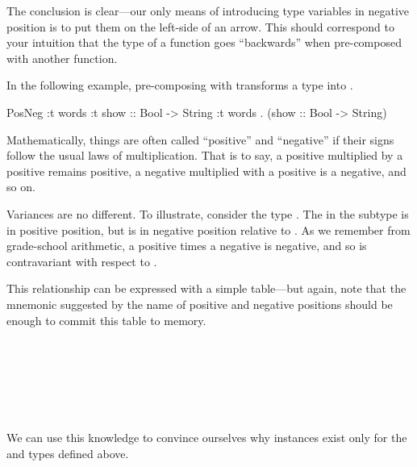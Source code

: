 \documentclass[book.tex]{subfiles}
\begin{document}
The conclusion is clear---our only means of introducing type variables in
negative position is to put them on the left-side of an arrow. This should
correspond to your intuition that the type of a function goes ``backwards'' when
pre-composed with another function.

In the following example, pre-composing with 
transforms a type  into .

\begin{dorepl}{PosNeg}
:t words
:t show :: Bool -> String
:t words . (show :: Bool -> String)
\end{dorepl}

Mathematically, things are often called ``positive'' and ``negative'' if their
signs follow the usual laws of multiplication. That is to say, a positive
multiplied by a positive remains positive, a negative multiplied with a positive
is a negative, and so on.

Variances are no different. To illustrate, consider the type . The  in the subtype  is in positive position, but
 is in negative position relative to . As we
remember from grade-school arithmetic, a positive times a negative is negative,
and so  is contravariant with respect to .

This relationship can be expressed with a simple table---but again, note that
the mnemonic suggested by the name of positive and negative positions should be
enough to commit this table to memory.

\spaceMyBox
\begin{myTable}
\hline
   \\ \hline
  \myRow{\myCol{$+$} \myCol{$+$} \myLastCol{$+$}} \\ \hline
  \myRow{\myCol{$+$} \myCol{$-$} \myLastCol{$-$}} \\ \hline
  \myRow{\myCol{$-$} \myCol{$+$} \myLastCol{$-$}} \\ \hline
  \myRow{\myCol{$-$} \myCol{$-$} \myLastCol{$+$}} \\ \hline
\end{myTable}
\spaceMyBox

We can use this knowledge to convince ourselves why  instances exist
only for the  and  types defined above.

\newcommand{\tyAnno}[4]{\ty{#1} \qquad&\cong\qquad #2 & #3 &= #4 \\ \\}
\end{document}
